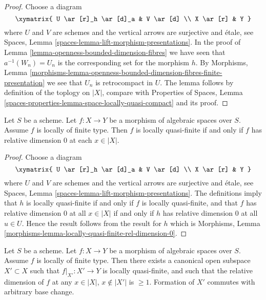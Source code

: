 \begin{proof}
Choose a diagram
$$
\xymatrix{
U \ar[r]_h \ar[d]_a & V \ar[d] \\
X \ar[r] & Y
}
$$
where $U$ and $V$ are schemes and the vertical arrows are surjective and
\'etale, see
Spaces, Lemma \ref{spaces-lemma-lift-morphism-presentations}.
In the proof of
Lemma \ref{lemma-openness-bounded-dimension-fibres}
we have seen that $a^{-1}(W_n) = U_n$ is the corresponding set
for the morphism $h$. By
Morphisms, Lemma
\ref{morphisms-lemma-openness-bounded-dimension-fibres-finite-presentation}
we see that $U_n$ is retrocompact in $U$.
The lemma follows by definition of the toplogy on $|X|$, compare with
Properties of Spaces,
Lemma \ref{spaces-properties-lemma-space-locally-quasi-compact}
and its proof.
\end{proof}

\begin{lemma}
\label{lemma-locally-quasi-finite-rel-dimension-0}
Let $S$ be a scheme.
Let $f : X \to Y$ be a morphism of algebraic spaces over $S$.
Assume $f$ is locally of finite type.
Then $f$ is locally quasi-finite if and only if $f$ has relative
dimension $0$ at each $x \in |X|$.
\end{lemma}

\begin{proof}
Choose a diagram
$$
\xymatrix{
U \ar[r]_h \ar[d]_a & V \ar[d] \\
X \ar[r] & Y
}
$$
where $U$ and $V$ are schemes and the vertical arrows are surjective and
\'etale, see
Spaces, Lemma \ref{spaces-lemma-lift-morphism-presentations}.
The definitions imply that
$h$ is locally quasi-finite if and only if $f$ is locally quasi-finite,
and that $f$ has relative dimension $0$ at all $x \in |X|$ if and
only if $h$ has relative dimension $0$ at all $u \in U$.
Hence the result follows from the result for $h$ which is
Morphisms, Lemma \ref{morphisms-lemma-locally-quasi-finite-rel-dimension-0}.
\end{proof}

\begin{lemma}
\label{lemma-locally-finite-type-quasi-finite-part}
Let $S$ be a scheme.
Let $f : X \to Y$ be a morphism of algebraic spaces over $S$.
Assume $f$ is locally of finite type.
Then there exists a canonical open subspace $X' \subset X$ such that
$f|_{X'} : X' \to Y$ is locally quasi-finite, and such that the
relative dimension of $f$ at any $x \in |X|$, $x \not \in |X'|$ is
$\geq 1$. Formation of $X'$ commutes with arbitrary base change.
\end{lemma}

